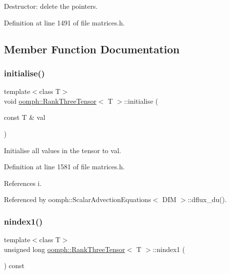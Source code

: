 Destructor\+: delete the pointers. 



Definition at line 1491 of file matrices.\+h.



\subsection{Member Function Documentation}
\mbox{\label{classoomph_1_1RankThreeTensor_ad63ed4eef146b20783c1df45584f0847}} 
\subsubsection{\texorpdfstring{initialise()}{initialise()}}
{\footnotesize\ttfamily template$<$class T$>$ \\
void \hyperlink{classoomph_1_1RankThreeTensor}{oomph\+::\+Rank\+Three\+Tensor}$<$ T $>$\+::initialise (\begin{DoxyParamCaption}\item[{const T \&}]{val }\end{DoxyParamCaption})\hspace{0.3cm}{\ttfamily [inline]}}



Initialise all values in the tensor to val. 



Definition at line 1581 of file matrices.\+h.



References i.



Referenced by oomph\+::\+Scalar\+Advection\+Equations$<$ D\+I\+M $>$\+::dflux\+\_\+du().

\mbox{\label{classoomph_1_1RankThreeTensor_a6efa48062b66970a12ac5bc712d8704b}} 
\subsubsection{\texorpdfstring{nindex1()}{nindex1()}}
{\footnotesize\ttfamily template$<$class T$>$ \\
unsigned long \hyperlink{classoomph_1_1RankThreeTensor}{oomph\+::\+Rank\+Three\+Tensor}$<$ T $>$\+::nindex1 (\begin{DoxyParamCaption}{ }\end{DoxyParamCaption}) const\hspace{0.3cm}{\ttfamily [inline]}}



